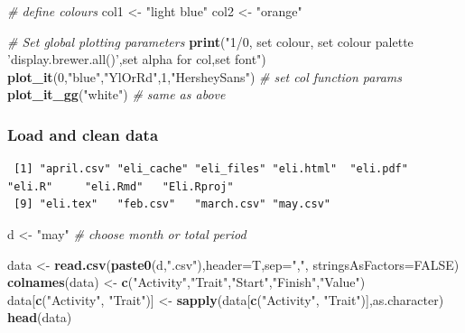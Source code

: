 \documentclass[10,portrait]{article}
\newenvironment{Shaded}{\begin{snugshade}}{\end{snugshade}}
\newcommand{\KeywordTok}[1]{\textcolor[rgb]{0.13,0.29,0.53}{\textbf{#1}}}
\newcommand{\DataTypeTok}[1]{\textcolor[rgb]{0.13,0.29,0.53}{#1}}
\newcommand{\DecValTok}[1]{\textcolor[rgb]{0.00,0.00,0.81}{#1}}
\newcommand{\StringTok}[1]{\textcolor[rgb]{0.31,0.60,0.02}{#1}}
\newcommand{\CommentTok}[1]{\textcolor[rgb]{0.56,0.35,0.01}{\textit{#1}}}
\newcommand{\OtherTok}[1]{\textcolor[rgb]{0.56,0.35,0.01}{#1}}
\newcommand{\OperatorTok}[1]{\textcolor[rgb]{0.81,0.36,0.00}{\textbf{#1}}}
\newcommand{\NormalTok}[1]{#1}
\begin{document}
\begin{Shaded}
\begin{Highlighting}[]
\CommentTok{# define colours  }
\NormalTok{col1 <-}\StringTok{ "light blue"}
\NormalTok{col2 <-}\StringTok{ "orange"}

\CommentTok{# Set global plotting parameters}
\KeywordTok{print}\NormalTok{(}\StringTok{"1/0, set colour, set colour palette 'display.brewer.all()',set alpha for col,set font"}\NormalTok{)}
\KeywordTok{plot_it}\NormalTok{(}\DecValTok{0}\NormalTok{,}\StringTok{"blue"}\NormalTok{,}\StringTok{"YlOrRd"}\NormalTok{,}\DecValTok{1}\NormalTok{,}\StringTok{"HersheySans"}\NormalTok{) }\CommentTok{# set col function params}
\KeywordTok{plot_it_gg}\NormalTok{(}\StringTok{"white"}\NormalTok{) }\CommentTok{# same as above}
\end{Highlighting}
\end{Shaded}

\subsubsection{Load and clean data}\label{load-and-clean-data}

\begin{Shaded}
\end{Shaded}

\begin{verbatim}
 [1] "april.csv" "eli_cache" "eli_files" "eli.html"  "eli.pdf"   "eli.R"     "eli.Rmd"   "Eli.Rproj"
 [9] "eli.tex"   "feb.csv"   "march.csv" "may.csv"  
\end{verbatim}

\begin{Shaded}
\begin{Highlighting}[]
\NormalTok{d <-}\StringTok{ "may"} \CommentTok{# choose month or total period}

\NormalTok{data <-}\StringTok{ }\KeywordTok{read.csv}\NormalTok{(}\KeywordTok{paste0}\NormalTok{(d,}\StringTok{".csv"}\NormalTok{),}\DataTypeTok{header=}\NormalTok{T,}\DataTypeTok{sep=}\StringTok{","}\NormalTok{, }\DataTypeTok{stringsAsFactors=}\OtherTok{FALSE}\NormalTok{)}
\KeywordTok{colnames}\NormalTok{(data) <-}\StringTok{ }\KeywordTok{c}\NormalTok{(}\StringTok{"Activity"}\NormalTok{,}\StringTok{"Trait"}\NormalTok{,}\StringTok{"Start"}\NormalTok{,}\StringTok{"Finish"}\NormalTok{,}\StringTok{"Value"}\NormalTok{)}
\NormalTok{data[}\KeywordTok{c}\NormalTok{(}\StringTok{"Activity"}\NormalTok{, }\StringTok{"Trait"}\NormalTok{)] <-}\StringTok{ }\KeywordTok{sapply}\NormalTok{(data[}\KeywordTok{c}\NormalTok{(}\StringTok{"Activity"}\NormalTok{, }\StringTok{"Trait"}\NormalTok{)],as.character)}
\KeywordTok{head}\NormalTok{(data) }
\end{Highlighting}
\end{Shaded}
\end{document}

